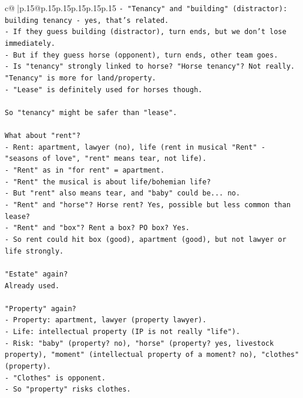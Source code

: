 \documentclass{article}
\begin{document}
{\begin{supertabular}{c@{$\;$}|p{.15\linewidth}@{}p{.15\linewidth}p{.15\linewidth}p{.15\linewidth}p{.15\linewidth}p{.15\linewidth}}
{{{\texttt{{-} "Tenancy" and "building" (distractor): building tenancy {-} yes, that's related.} \\
\texttt{{-} If they guess building (distractor), turn ends, but we don't lose immediately.} \\
\texttt{{-} But if they guess horse (opponent), turn ends, other team goes.} \\
\texttt{{-} Is "tenancy" strongly linked to horse? "Horse tenancy"? Not really. "Tenancy" is more for land/property.} \\
\texttt{{-} "Lease" is definitely used for horses though.} \\
\\ 
\texttt{So "tenancy" might be safer than "lease".} \\
\\ 
\texttt{What about "rent"?} \\
\texttt{{-} Rent: apartment, lawyer (no), life (rent in musical "Rent" {-} "seasons of love", "rent" means tear, not life).} \\
\texttt{{-} "Rent" as in "for rent" = apartment.} \\
\texttt{{-} "Rent" the musical is about life/bohemian life?} \\
\texttt{{-} But "rent" also means tear, and "baby" could be... no.} \\
\texttt{{-} "Rent" and "horse"? Horse rent? Yes, possible but less common than lease?} \\
\texttt{{-} "Rent" and "box"? Rent a box? PO box? Yes.} \\
\texttt{{-} So rent could hit box (good), apartment (good), but not lawyer or life strongly.} \\
\\ 
\texttt{"Estate" again?} \\
\texttt{Already used.} \\
\\ 
\texttt{"Property" again?} \\
\texttt{{-} Property: apartment, lawyer (property lawyer).} \\
\texttt{{-} Life: intellectual property (IP is not really "life").} \\
\texttt{{-} Risk: "baby" (property? no), "horse" (property? yes, livestock property), "moment" (intellectual property of a moment? no), "clothes" (property).} \\
\texttt{{-} "Clothes" is opponent.} \\
\texttt{{-} So "property" risks clothes.} \\
}}}
\end{supertabular}}
\end{document}
